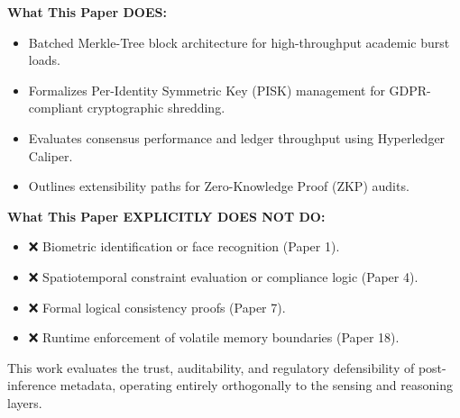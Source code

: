 \documentclass[conference]{IEEEtran}
\begin{document}
\textbf{What This Paper DOES:}
\begin{itemize}
    \item Batched Merkle-Tree block architecture for high-throughput academic burst loads.
    \item Formalizes Per-Identity Symmetric Key (PISK) management for GDPR-compliant cryptographic shredding.
    \item Evaluates consensus performance and ledger throughput using Hyperledger Caliper.
    \item Outlines extensibility paths for Zero-Knowledge Proof (ZKP) audits.
\end{itemize}

\textbf{What This Paper EXPLICITLY DOES NOT DO:}
\begin{itemize}
    \item ❌ Biometric identification or face recognition (Paper 1).
    \item ❌ Spatiotemporal constraint evaluation or compliance logic (Paper 4).
    \item ❌ Formal logical consistency proofs (Paper 7).
    \item ❌ Runtime enforcement of volatile memory boundaries (Paper 18).
\end{itemize}

This work evaluates the trust, auditability, and regulatory defensibility of post-inference metadata, operating entirely orthogonally to the sensing and reasoning layers.
\end{document}
